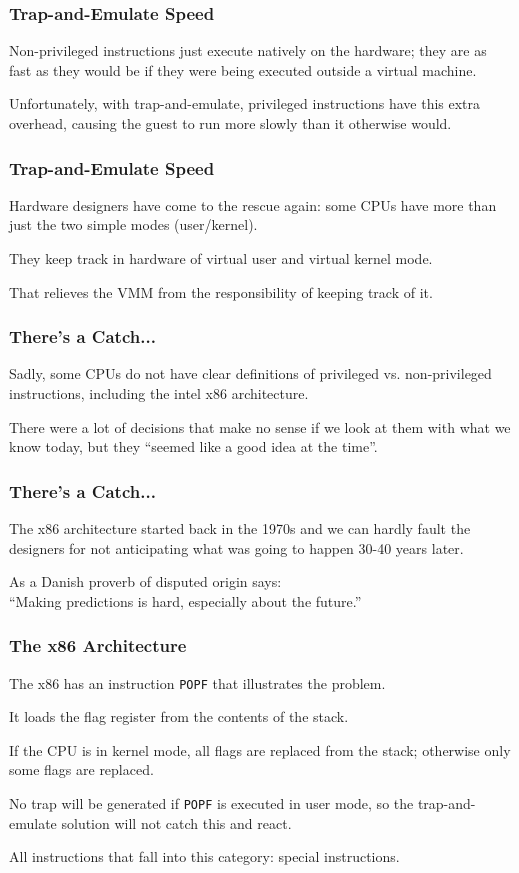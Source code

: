 \begin{frame}
\frametitle{Trap-and-Emulate Speed}

Non-privileged instructions just execute natively on the hardware; they are as fast as they would be if they were being executed outside a virtual machine. 

Unfortunately, with trap-and-emulate, privileged instructions have this extra overhead, causing the guest to run more slowly than it otherwise would. 

\end{frame}

\begin{frame}
\frametitle{Trap-and-Emulate Speed}

Hardware designers have come to the rescue again: some CPUs have more than just the two simple modes (user/kernel).

They keep track in hardware of virtual user and virtual kernel mode. 

That relieves the VMM from the responsibility of keeping track of it.


\end{frame}

\begin{frame}
\frametitle{There's a Catch...}

Sadly, some CPUs do not have clear definitions of privileged vs. non-privileged instructions, including the intel x86 architecture. 

There were a lot of decisions that make no sense if we look at them with what we know today, but they ``seemed like a good idea at the time''. 

\end{frame}

\begin{frame}
\frametitle{There's a Catch...}

The x86 architecture started back in the 1970s and we can hardly fault the designers for not anticipating what was going to happen 30-40 years later. 

As a Danish proverb of disputed origin says:\\
\quad ``Making predictions is hard, especially about the future.''


\end{frame}

\begin{frame}
\frametitle{The x86 Architecture}

The x86 has an instruction \texttt{POPF} that illustrates the problem. 

It loads the flag register from the contents of the stack. 

If the CPU is in kernel mode, all flags are replaced from the stack; otherwise only some flags are replaced. 

No trap will be generated if \texttt{POPF} is executed in user mode, so the trap-and-emulate solution will not catch this and react. 

All instructions that fall into this category: \alert{special instructions}.

\end{frame}

